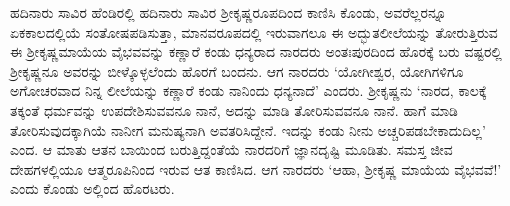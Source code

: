 ಹದಿನಾರು ಸಾವಿರ ಹೆಂಡಿರಲ್ಲಿ ಹದಿನಾರು ಸಾವಿರ ಶ್ರೀಕೃಷ್ಣರೂಪದಿಂದ ಕಾಣಿಸಿ ಕೊಂಡು, ಅವರೆಲ್ಲರನ್ನೂ ಏಕಕಾಲದಲ್ಲಿಯೆ ಸಂತೋಷಪಡಿಸುತ್ತಾ, ಮಾನವರೂಪದಲ್ಲಿ ಇರುವಾಗಲೂ ಈ ಅದ್ಭುತಲೀಲೆಯನ್ನು ತೋರುತ್ತಿರುವ ಈ ಶ್ರೀಕೃಷ್ಣಮಾಯೆಯ ವೈಭವವನ್ನು ಕಣ್ಣಾರೆ ಕಂಡು ಧನ್ಯರಾದ ನಾರದರು ಅಂತಃಪುರದಿಂದ ಹೊರಕ್ಕೆ ಬರು ವಷ್ಟರಲ್ಲಿ ಶ್ರೀಕೃಷ್ಣನೂ ಅವರನ್ನು ಬೀಳ್ಕೊಳ್ಳಲೆಂದು ಹೊರಗೆ ಬಂದನು. ಆಗ ನಾರದರು ‘ಯೋಗೀಶ್ವರ, ಯೋಗಿಗಳಿಗೂ ಅಗೋಚರವಾದ ನಿನ್ನ ಲೀಲೆಯನ್ನು ಕಣ್ಣಾರೆ ಕಂಡು ನಾನಿಂದು ಧನ್ಯನಾದೆ’ ಎಂದರು. ಶ್ರೀಕೃಷ್ಣನು ‘ನಾರದ, ಕಾಲಕ್ಕೆ ತಕ್ಕಂತೆ ಧರ್ಮವನ್ನು ಉಪದೇಶಿಸುವವನೂ ನಾನೆ, ಅದನ್ನು ಮಾಡಿ ತೋರಿಸುವವನೂ ನಾನೆ. ಹಾಗೆ ಮಾಡಿ ತೋರಿಸುವುದಕ್ಕಾಗಿಯೆ ನಾನೀಗ ಮನುಷ್ಯನಾಗಿ ಅವತರಿಸಿದ್ದೇನೆ. ಇದನ್ನು ಕಂಡು ನೀನು ಅಚ್ಚರಿಪಡಬೇಕಾದುದಿಲ್ಲ’ ಎಂದ. ಆ ಮಾತು ಆತನ ಬಾಯಿಂದ ಬರುತ್ತಿದ್ದಂತೆಯೆ ನಾರದರಿಗೆ ಜ್ಞಾನದೃಷ್ಟಿ ಮೂಡಿತು. ಸಮಸ್ತ ಜೀವ ದೇಹಗಳಲ್ಲಿಯೂ ಆತ್ಮರೂಪಿನಿಂದ ಇರುವ ಆತ ಕಾಣಿಸಿದ. ಆಗ ನಾರದರು ‘ಆಹಾ, ಶ್ರೀಕೃಷ್ಣ ಮಾಯೆಯ ವೈಭವವೆ!’ ಎಂದು ಕೊಂಡು ಅಲ್ಲಿಂದ ಹೊರಟರು.

